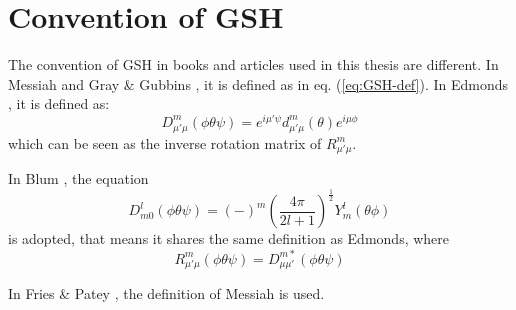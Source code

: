 \section{Convention of GSH\label{sec:Convention-of-GSH}}

The convention of \acs{GSH} in books and articles used in this thesis
are different. In Messiah \citep{Messiah} and Gray \& Gubbins \citep{Gray-Gubbins},
it is defined as in eq. (\ref{eq:GSH-def}). In Edmonds \citep{Edmonds},
it is defined as:
\begin{equation}
D_{\mu'\mu}^{m}(\phi\theta\psi)=e^{i\mu'\psi}d_{\mu'\mu}^{m}(\theta)e^{i\mu\phi}\label{eq:GSH-def-1}
\end{equation}
which can be seen as the inverse rotation matrix of $R_{\mu'\mu}^{m}$.

In Blum \citep{Blum_I,Blum_II}, the equation 
\begin{equation}
D_{m0}^{l}(\phi\theta\psi)=\left(-\right)^{m}\left(\dfrac{4\pi}{2l+1}\right)^{\frac{1}{2}}Y_{m}^{l}(\theta\phi)
\end{equation}
is adopted, that means it shares the same definition as Edmonds, where
\begin{equation}
R_{\mu'\mu}^{m}(\phi\theta\psi)=D_{\mu\mu'}^{m*}(\phi\theta\psi)\label{eq:GSH-def-2}
\end{equation}

In Fries \& Patey \citep{Fries_Patey_1985}, the definition of Messiah
is used.
